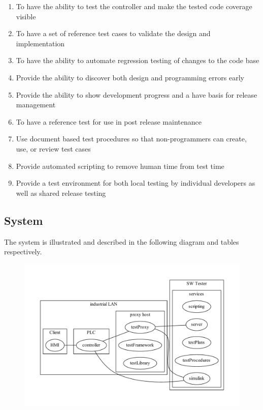 \documentclass[11pt,english,twoside]{extarticle}
\begin{document}
\begin{enumerate}
  \item To have the ability to test the controller and make the tested code coverage visible
	\item To have a set of reference test cases to validate the design and implementation
	\item To have the ability to automate regression testing of changes to the code base
	\item Provide the ability to discover both design and programming errors early
	\item Provide the ability to show development progress and a have basis for release management
	\item To have a reference test for use in post release maintenance
  \item Use document based test procedures so that non-programmers can create, use, or review test cases 
	\item Provide automated scripting to remove human time from test time
  \item Provide a test environment for both local testing by individual developers as well as shared release testing  
\end{enumerate}

\subsection*{System}

The system is illustrated and described in the following diagram and tables respectively.
\begin{figure}[h]
\includegraphics[scale=0.8]{figures/sw_test.pdf} 
\end{figure}
\end{document}
